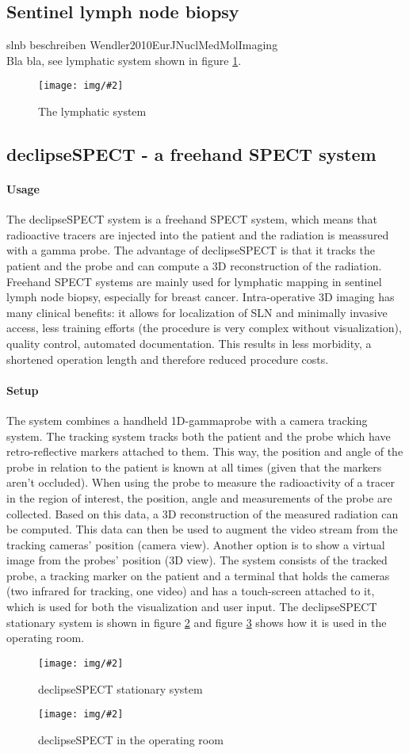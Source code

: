 \documentclass{scrartcl}
\newcommand{\red}[1]{{\color{red} #1}}
\newcommand{\graphic}[3][width=\linewidth] %
{
  \begin{figure}[h!t]
    \centering
    \texttt{[image: img/\#2]}
    \caption{#3}
    \label{fig:#2}
  \end{figure}
}
\newcommand{\refFigure}[1]{figure \ref{fig:#1}}
\begin{document}
\subsection{Sentinel lymph node biopsy}
\red{slnb beschreiben Wendler2010EurJNuclMedMolImaging}\\
Bla bla, see lymphatic system shown in \refFigure{lymphatic-system}.
\graphic[scale=.7]{lymphatic-system}{The lymphatic system}


\subsection{declipseSPECT - a freehand SPECT system}
\paragraph*{Usage}
The declipseSPECT system is a freehand SPECT system, which means that radioactive tracers are injected into the patient and the radiation is meassured with a gamma probe. The advantage of declipseSPECT is that it tracks the patient and the probe and can compute a 3D reconstruction of the radiation.
Freehand SPECT systems are mainly used for lymphatic mapping in sentinel lymph node biopsy, especially for breast cancer. Intra-operative 3D imaging has many clinical benefits: it allows for localization of SLN and minimally invasive access, less training efforts (the procedure is very complex without visualization), quality control, automated documentation. This results in less morbidity, a shortened operation length and therefore reduced procedure costs.
\paragraph*{Setup}
The system combines a handheld 1D-gammaprobe with a camera tracking system. The tracking system tracks both the patient and the probe which have retro-reflective markers attached to them. This way, the position and angle of the probe in relation to the patient is known at all times (given that the markers aren't occluded). When using the probe to measure the radioactivity of a tracer in the region of interest, the position, angle and measurements of the probe are collected. Based on this data, a 3D reconstruction of the measured radiation can be computed.
This data can then be used to augment the video stream from the tracking cameras' position (camera view). Another option is to show a virtual image from the probes' position (3D view).
The system consists of the tracked probe, a tracking marker on the patient and a terminal that holds the cameras (two infrared for tracking, one video) and has a touch-screen attached to it, which is used for both the visualization and user input. The declipseSPECT stationary system is shown in \refFigure{declipseSPECT} and \refFigure{declipseSPECT-OR} shows how it is used in the operating room.
\graphic[scale=.7]{declipseSPECT}{declipseSPECT stationary system}
\graphic[scale=.7]{declipseSPECT-OR}{declipseSPECT in the operating room}
\end{document}
